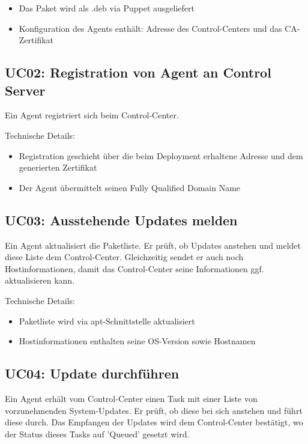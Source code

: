 \begin{itemize}
    \item Das Paket wird als .deb via Puppet ausgeliefert
    \item Konfiguration des Agents enthält: Adresse des Control-Centers und das CA-Zertifikat
\end{itemize}


\subsection*{UC02: Registration von Agent an Control Server}
\label{sec:uc_02}

Ein Agent registriert sich beim Control-Center.

Technische Details:

\begin{itemize}
    \item Registration geschieht über die beim Deployment erhaltene Adresse und dem generierten Zertifikat
    \item Der Agent übermittelt seinen Fully Qualified Domain Name
\end{itemize}

\subsection*{UC03: Ausstehende Updates melden}
\label{sec:uc_03}

Ein Agent aktualisiert die Paketliste. Er prüft, ob Updates anstehen und meldet diese Liste dem Control-Center. Gleichzeitig sendet er auch noch Hostinformationen, damit das Control-Center seine Informationen ggf. aktualisieren kann.
 

Technische Details:

\begin{itemize}
    \item Paketliste wird via apt-Schnittstelle aktualisiert
    \item Hostinformationen enthalten seine OS-Version sowie Hostnamen
\end{itemize}

\subsection*{UC04: Update durchführen}
\label{sec:uc_04}

Ein Agent erhält vom Control-Center einen Task mit einer Liste von vorzunehmenden System-Updates. Er prüft, ob diese bei sich anstehen und führt diese durch. Das Empfangen der Updates wird dem Control-Center bestätigt, wo der Status dieses Tasks auf 'Queued' gesetzt wird.

